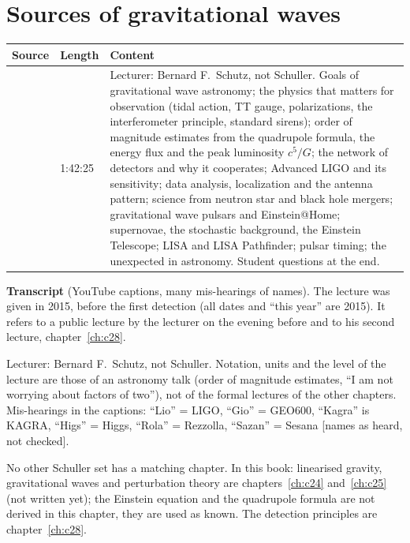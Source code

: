\chapter{Sources of gravitational waves}\label{ch:c27}
\begin{paracol}{2}

\begin{sources}
\begin{tabularx}{\linewidth}{@{}l l L@{}}
\toprule
\textbf{Source} & \textbf{Length} & \textbf{Content}\\
\midrule
{} & 1:42:25 & Lecturer: Bernard F.\ Schutz, not Schuller. Goals of gravitational wave astronomy; the physics that matters for observation (tidal action, TT gauge, polarizations, the interferometer principle, standard sirens); order of magnitude estimates from the quadrupole formula, the energy flux and the peak luminosity $c^5/G$; the network of detectors and why it cooperates; Advanced LIGO and its sensitivity; data analysis, localization and the antenna pattern; science from neutron star and black hole mergers; gravitational wave pulsars and Einstein@Home; supernovae, the stochastic background, the Einstein Telescope; LISA and LISA Pathfinder; pulsar timing; the unexpected in astronomy. Student questions at the end.\\
\bottomrule
\end{tabularx}

\smallskip
\textbf{Transcript}  (YouTube captions, many mis-hearings of names). The lecture was given in 2015, before the first detection (all dates and ``this year'' are 2015). It refers to a public lecture by the lecturer on the evening before and to his second lecture, chapter~\ref{ch:c28}.
\end{sources}

\begin{coursenote}[Lecturer]
Lecturer: Bernard F.\ Schutz, not Schuller. Notation, units and the level of the lecture are those of an astronomy talk (order of magnitude estimates, ``I am not worrying about factors of two''), not of the formal lectures of the other chapters. Mis-hearings in the captions: ``Lio'' = LIGO, ``Gio'' = GEO600, ``Kagra'' is KAGRA, ``Higs'' = Higgs, ``Rola'' = Rezzolla, ``Sazan'' = Sesana [names as heard, not checked].
\end{coursenote}

\begin{reading}
No other Schuller set has a matching chapter. In this book: linearised gravity, gravitational waves and perturbation theory are chapters~\ref{ch:c24} and~\ref{ch:c25} (not written yet); the Einstein equation and the quadrupole formula are not derived in this chapter, they are used as known. The detection principles are chapter~\ref{ch:c28}.
\end{reading}


\end{paracol}
